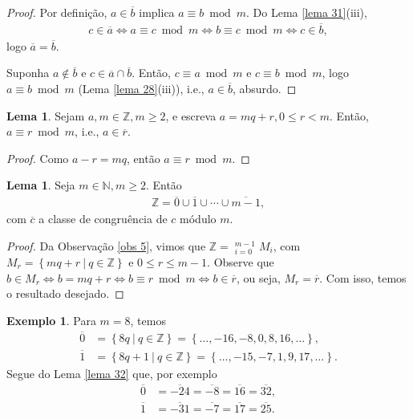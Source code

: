\documentclass[a4paper,11pt,twoside, leqno]{article}
\theoremstyle{definition}
\newtheorem{lemma}[theorem]{Lema}
\newtheorem*{example}{Exemplo}
\begin{document}
\begin{proof}
	Por definição, $a\in\overline{b}$ implica $a\equiv b\bmod m$. Do Lema \eqref{lema 31}(iii), 
	\begin{align*}
	c\in\overline{a}\Leftrightarrow a\equiv c\bmod m \Leftrightarrow b\equiv c\bmod m \Leftrightarrow c\in\overline{b},
	\end{align*}
	logo $\overline{a} = \overline{b}$.
	
	Suponha $a\notin\overline{b}$ e $c\in\overline{a}\cap\overline{b}$. Então, $c\equiv a\bmod m$ e $c\equiv b\bmod m$, logo $a\equiv b\bmod m$ (Lema \eqref{lema 28}(iii)), i.e., $a\in\overline{b}$, absurdo.
\end{proof}
\begin{lemma}
	\label{lema 33}
	Sejam $a,m\in\mathbb{Z}, m\geq 2$, e escreva $a = mq+r, 0\leq r < m$. Então, $a\equiv r\bmod m$, i.e., $a\in\overline{r}$.
\end{lemma}
\begin{proof}
	Como $a-r = mq$, então $a\equiv r\bmod m$.
\end{proof}
\begin{lemma}
	\label{lema 34}
	Seja $m\in\mathbb{N}, m\geq 2$. Então
	\begin{align*}
	\mathbb{Z} = \overline{0}\cup\overline{1}\cup\cdots\cup\overline{m-1},
	\end{align*}
	com $\overline{c}$ a classe de congruência de $c$ módulo $m$.
\end{lemma}
\begin{proof}
	Da Observação \eqref{obs 5}, vimos que $\displaystyle{\mathbb{Z} = \mathop{\dot\bigcup}_{i=0}^{m-1}M_i}$, com $M_r = \left\{ mq+r \ | \ q\in\mathbb{Z} \right\}$ e $0\leq r\leq m-1$. Observe que $b\in M_r \Leftrightarrow b = mq + r \Leftrightarrow b\equiv r\bmod m \Leftrightarrow b\in\overline{r}$, ou seja, $M_r = \overline{r}$. Com isso, temos o resultado desejado.
\end{proof}
\begin{example}
	Para $m=8$, temos
	\begin{align*}
	\overline{0} &= \left\{ 8q \ | \ q\in\mathbb{Z} \right\} = \left\{ \dots, -16, -8, 0, 8, 16, \dots \right\}, \\
	\overline{1} &= \left\{ 8q+1 \ | \ q\in\mathbb{Z} \right\} = \left\{ \dots, -15, -7, 1, 9, 17, \dots \right\}.
	\end{align*}
	Segue do Lema \eqref{lema 32} que, por exemplo
	\begin{align*}
	\overline{0} &= \overline{-24} = \overline{-8} = \overline{16} = \overline{32}, \\
	\overline{1} &= \overline{-31} = \overline{-7} = \overline{17} = \overline{25}.
	\end{align*}
\end{example}
\end{document}

